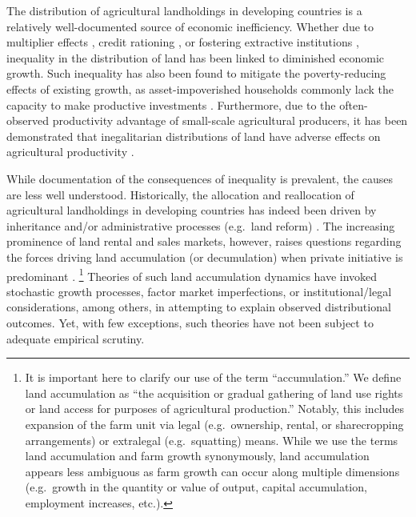 \documentclass[english]{article}
\begin{document}
The distribution of agricultural landholdings in developing countries is a 
relatively well-documented source of economic inefficiency.
Whether due to multiplier effects \citep{mellor1976}, credit rationing 
\citep{deininger1998}, or fostering extractive institutions 
\citep{acemoglu2002}, inequality in the distribution of land has been linked 
to diminished economic growth.
Such inequality has also been found to mitigate the poverty-reducing effects 
of existing growth, as asset-impoverished households commonly lack the 
capacity to make productive investments 
\citep{deininger1998, ravallion2002, lipton2009}.
Furthermore, due to the often-observed productivity advantage of small-scale 
agricultural producers, it has been demonstrated that inegalitarian distributions 
of land have adverse effects on agricultural productivity  
\citep{eswaran1986, vollrath2007, lipton2009}.

While documentation of the consequences of inequality is prevalent, the causes 
are less well understood.
Historically, the allocation and reallocation of agricultural landholdings in 
developing countries has indeed been driven by inheritance and/or 
administrative processes (e.g.\ land reform) 
\citep{binswanger1995, deininger2001, lipton2009}.
The increasing prominence of land rental and sales markets, however, raises 
questions regarding the forces driving land accumulation (or decumulation) 
when private initiative is predominant
\citep{boucher2005, deininger2008b, holden2009}.%
\footnote{It is important here to clarify our use of the term ``accumulation.''
We define land accumulation as ``the acquisition or gradual gathering of land 
use rights or land access for purposes of agricultural production.''  
Notably, this includes expansion of the farm unit via legal (e.g.\ ownership, 
rental, or sharecropping arrangements) or extralegal (e.g.\ squatting) means.
While we use the terms land accumulation and farm growth synonymously, 
land accumulation appears less ambiguous as farm growth can occur along
multiple dimensions (e.g.\ growth in the quantity or value of output, capital
accumulation, employment increases, etc.).}
Theories of such land accumulation dynamics have invoked stochastic growth 
processes, factor market imperfections, or institutional/legal considerations, 
among others, in attempting to explain observed distributional outcomes.
Yet, with few exceptions, such theories have not been subject to adequate
empirical scrutiny.
\end{document}
